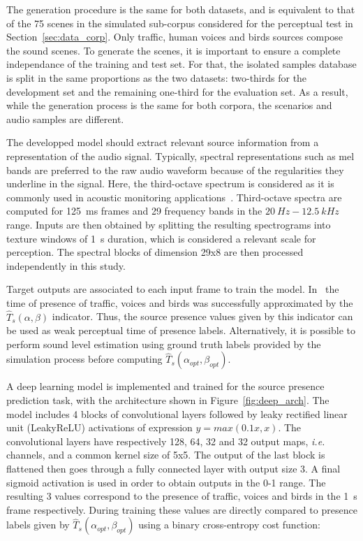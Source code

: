 \documentclass[twocolumn]{article}
\begin{document}
The generation procedure is the same for both datasets, and is equivalent to that of the 75 scenes in the simulated sub-corpus considered for the perceptual test in Section~\ref{sec:data_corp}. Only traffic, human voices and birds sources compose the sound scenes. To generate the scenes, it is important to ensure a complete independance of the training and test set. For that, the isolated samples database is split in the same proportions as the two datasets: two-thirds for the development set and the remaining one-third for the evaluation set. As a result, while the generation process is the same for both corpora, the scenarios and audio samples are different.

The developped model should extract relevant source information from a representation of the audio signal. Typically, spectral representations such as mel bands are preferred to the raw audio waveform because of the regularities they underline in the signal. Here, the third-octave spectrum is considered as it is commonly used in acoustic monitoring applications~\cite{ardouin2018, gontier2017}. Third-octave spectra are computed for 125~ms frames and 29 frequency bands in the $20~Hz - 12.5~kHz$ range. Inputs are then obtained by splitting the resulting spectrograms into texture windows of 1~s duration, which is considered a relevant scale for perception. The spectral blocks of dimension 29x8 are then processed independently in this study.

Target outputs are associated to each input frame to train the model. In~\cite{gontier2018} the time of presence of traffic, voices and birds was successfully approximated by the $\hat T_s(\alpha, \beta)$ indicator. Thus, the source presence values given by this indicator can be used as weak perceptual time of presence labels. Alternatively, it is possible to perform sound level estimation using ground truth labels provided by the simulation process before computing $\hat T_s(\alpha_{opt}, \beta_{opt})$.

A deep learning model is implemented and trained for the source presence prediction task, with the architecture shown in Figure~\ref{fig:deep_arch}. The model includes 4 blocks of convolutional layers followed by leaky rectified linear unit (LeakyReLU) activations of expression $y = max(0.1x, x)$. The convolutional layers have respectively 128, 64, 32 and 32 output maps, \textit{i.e.} channels, and a common kernel size of 5x5. The output of the last block is flattened then goes through a fully connected layer with output size 3. A final sigmoid activation is used in order to obtain outputs in the 0-1 range. The resulting 3 values correspond to the presence of traffic, voices and birds in the 1~s frame respectively. During training these values are directly compared to presence labels given by $\hat T_s(\alpha_{opt}, \beta_{opt})$ using a binary cross-entropy cost function:
\end{document}
